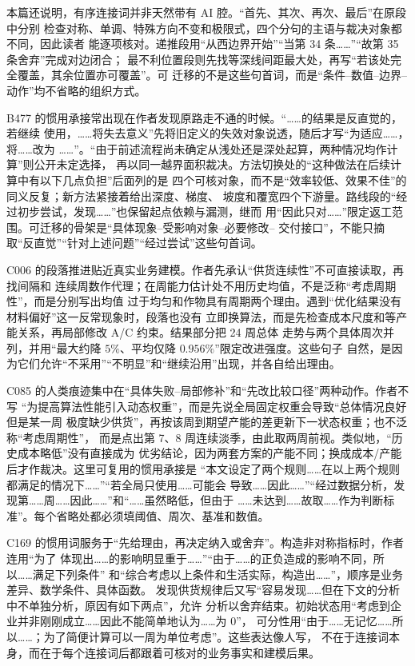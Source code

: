本篇还说明，有序连接词并非天然带有 AI 腔。“首先、其次、再次、最后”在原段中分别
检查对称、单调、特殊方向不变和极限式，四个分句的主语与裁决对象都不同，因此读者
能逐项核对。递推段用“从西边界开始”“当第 34 条……”“故第 35 条舍弃”完成对边闭合；
最不利位置段则先找等深线间距最大处，再写“若该处完全覆盖，其余位置亦可覆盖”。可
迁移的不是这些句首词，而是“条件--数值--边界--动作”均不省略的组织方式。

B477 的惯用承接常出现在作者发现原路走不通的时候。“……的结果是反直觉的，若继续
使用，……将失去意义”先将旧定义的失效对象说透，随后才写“为适应……，将……改为
……”。“由于前述流程尚未确定从浅处还是深处起算，两种情况均作计算”则公开未定选择，
再以同一越界面积裁决。方法切换处的“这种做法在后续计算中有以下几点负担”后面列的是
四个可核对象，而不是“效率较低、效果不佳”的同义反复；新方法紧接着给出深度、梯度、
坡度和覆宽四个下游量。路线段的“经过初步尝试，发现……”也保留起点依赖与漏测，继而
用“因此只对……”限定返工范围。可迁移的骨架是“具体现象--受影响对象--必要修改--
交付接口”，不能只摘取“反直觉”“针对上述问题”“经过尝试”这些句首词。

C006 的段落推进贴近真实业务建模。作者先承认“供货连续性”不可直接读取，再找间隔和
连续周数作代理；在周能力估计处不用历史均值，不是泛称“考虑周期性”，而是分别写出均值
过于均匀和作物具有周期两个理由。遇到“优化结果没有材料偏好”这一反常现象时，段落也没有
立即换算法，而是先检查成本尺度和等产能关系，再局部修改 A/C 约束。结果部分把 24 周总体
走势与两个具体周次并列，并用“最大约降 $5\%$、平均仅降 $0.956\%$”限定改进强度。这些句子
自然，是因为它们允许“不采用”“不明显”和“继续沿用”出现，并各自给出理由。

C085 的人类痕迹集中在“具体失败--局部修补”和“先改比较口径”两种动作。作者不写
“为提高算法性能引入动态权重”，而是先说全局固定权重会导致“总体情况良好但是某一周
极度缺少供货”，再按该周到期望产能的差更新下一状态权重；也不泛称“考虑周期性”，
而是点出第 7、8 周连续淡季，由此取两周前视。类似地，“历史成本略低”没有直接成为
优劣结论，因为两套方案的产能不同；换成成本/产能后才作裁决。这里可复用的惯用承接是
“本文设定了两个规则……在以上两个规则都满足的情况下……”“若全局只使用……可能会
导致……因此……”“经过数据分析，发现第……周……因此……”和“……虽然略低，但由于
……未达到……故取……作为判断标准”。每个省略处都必须填阈值、周次、基准和数值。

C169 的惯用词服务于“先给理由，再决定纳入或舍弃”。构造非对称指标时，作者连用“为了
体现出……的影响明显重于……”“由于……的正负造成的影响不同，所以……满足下列条件”
和“综合考虑以上条件和生活实际，构造出……”，顺序是业务差异、数学条件、具体函数。
发现供货规律后又写“容易发现……但在下文的分析中不单独分析，原因有如下两点”，允许
分析以舍弃结束。初始状态用“考虑到企业并非刚刚成立……因此不能简单地认为……为 0”，
可分性用“由于……无记忆……所以……；为了简便计算可以一周为单位考虑”。这些表达像人写，
不在于连接词本身，而在于每个连接词后都跟着可核对的业务事实和建模后果。

